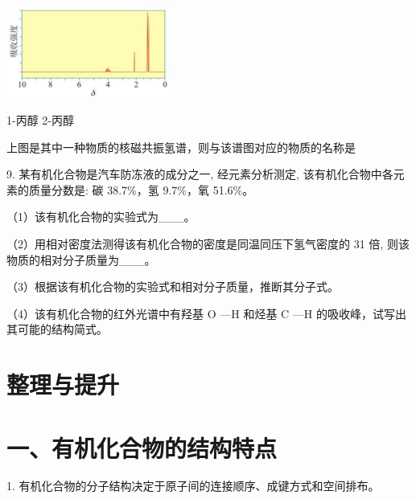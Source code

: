 \documentclass[10pt]{article}
\begin{document}
\begin{center}
\includegraphics[max width=0.4\textwidth]{images/0190efc5-b58a-7c43-bfb0-e0a030df9cfd_27_928609.jpg}
\end{center}

1-丙醇 2-丙醇

上图是其中一种物质的核磁共振氢谱，则与该谱图对应的物质的名称是

9. 某有机化合物是汽车防冻液的成分之一, 经元素分析测定, 该有机化合物中各元素的质量分数是: 碳 38.7\%，氢 9.7\%，氧 51.6\%。

（1）该有机化合物的实验式为\_\_\_。

（2）用相对密度法测得该有机化合物的密度是同温同压下氢气密度的 31 倍, 则该物质的相对分子质量为\_\_\_。

（3）根据该有机化合物的实验式和相对分子质量，推断其分子式。

（4）该有机化合物的红外光谱中有羟基 \(\mathrm{O}\) —H 和烃基 \(\mathrm{C}\) —H 的吸收峰，试写出其可能的结构简式。

\section*{整理与提升}

\section*{一、有机化合物的结构特点}

1. 有机化合物的分子结构决定于原子间的连接顺序、成键方式和空间排布。
\end{document}
